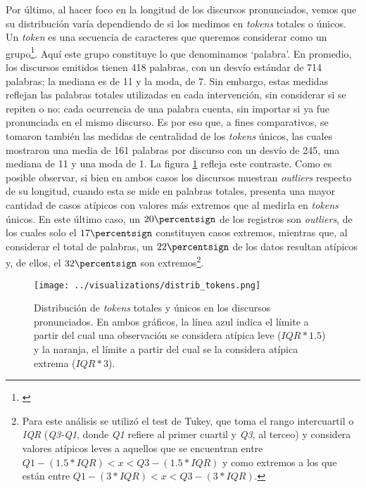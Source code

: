 Por último, al hacer foco en la longitud de los discursos pronunciados, vemos que su
distribución varía dependiendo de si los medimos en \textit{tokens} totales o únicos.
Un \textit{token} es una secuencia de caracteres que queremos considerar como un
grupo\footnote{\citet*{bird2009natural}}. Aquí este grupo constituye lo que denominamos
`palabra'. En promedio, los discursos emitidos tienen 418 palabras, con un desvío
estándar de 714 palabras; la mediana es de 11 y la moda, de 7. Sin embargo, estas medidas
reflejan las palabras totales utilizadas en cada intervención, sin considerar si se repiten
o no: cada ocurrencia de una palabra cuenta, sin importar si ya fue pronunciada en el mismo
discurso. Es por eso que, a fines comparativos, se tomaron también las medidas de centralidad
de los \textit{tokens} únicos, las cuales mostraron una media de 161 palabras por discurso
con un desvío de 245, una mediana de 11 y una moda de 1. La figura \ref{fig-distrib-tokens}
refleja este contraste. Como es posible observar, si bien en ambos casos los discursos
muestran \textit{outliers} respecto de su longitud, cuando esta se mide en palabras
totales, presenta una mayor cantidad de casos atípicos con valores más extremos que
al medirla en \textit{tokens} únicos. En este último caso, un
$20\percentsign$ de los registros son \textit{outliers}, de los cuales solo el
$17\percentsign$ constituyen casos extremos, mientras que, al considerar
el total de palabras, un $22\percentsign$ de los datos resultan atípicos y,
de ellos, el $32\percentsign$ son extremos\footnote{Para este análisis se utilizó el
test de Tukey, que toma el rango intercuartil o \textit{IQR} (\textit{Q3-Q1}, donde
\textit{Q1} refiere al primer cuartil y \textit{Q3}, al terceo) y considera
valores atípicos leves a aquellos que se encuentran entre
$Q1 - (1.5 * IQR) < x < Q3 - (1.5 * IQR)$ y como extremos a los que están entre
$Q1 - (3 * IQR) < x < Q3 - (3 * IQR)$.}.

\begin{figure}[h!]
    \centering
    \texttt{[image: ../visualizations/distrib\_tokens.png]}
    \caption{Distribución de \textit{tokens} totales y únicos en los discursos pronunciados. En ambos gráficos,
    la línea azul indica el límite a partir del cual una observación se considera atípica leve
    ($IQR*1.5$) y la naranja, el límite a partir del cual se la considera atípica extrema ($IQR*3$).}
    \label{fig-distrib-tokens}
\end{figure}


